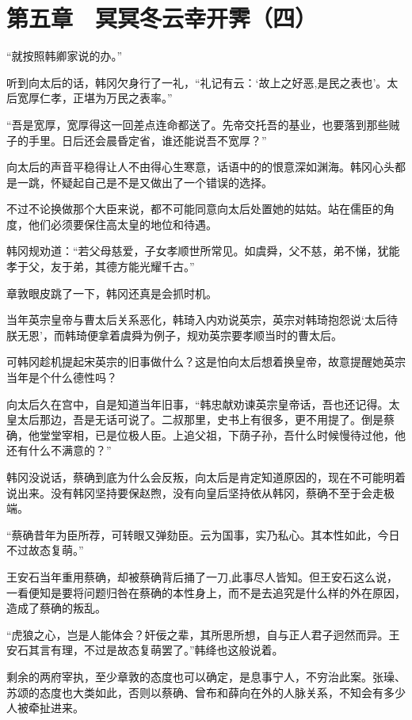 \section{第五章　冥冥冬云幸开霁（四）}

“就按照韩卿家说的办。”

听到向太后的话，韩冈欠身行了一礼，“礼记有云：‘故上之好恶,是民之表也’。太后宽厚仁孝，正堪为万民之表率。”

“吾是宽厚，宽厚得这一回差点连命都送了。先帝交托吾的基业，也要落到那些贼子的手里。日后还会晨昏定省，谁还能说吾不宽厚？”

向太后的声音平稳得让人不由得心生寒意，话语中的的恨意深如渊海。韩冈心头都是一跳，怀疑起自己是不是又做出了一个错误的选择。

不过不论换做那个大臣来说，都不可能同意向太后处置她的姑姑。站在儒臣的角度，他们必须要保住高太皇的地位和待遇。

韩冈规劝道：“若父母慈爱，子女孝顺世所常见。如虞舜，父不慈，弟不悌，犹能孝于父，友于弟，其德方能光耀千古。”

章敦眼皮跳了一下，韩冈还真是会抓时机。

当年英宗皇帝与曹太后关系恶化，韩琦入内劝说英宗，英宗对韩琦抱怨说‘太后待朕无恩’，而韩琦便拿着虞舜为例子，规劝英宗要孝顺当时的曹太后。

可韩冈趁机提起宋英宗的旧事做什么？这是怕向太后想着换皇帝，故意提醒她英宗当年是个什么德性吗？

向太后久在宫中，自是知道当年旧事，“韩忠献劝谏英宗皇帝话，吾也还记得。太皇太后那边，吾是无话可说了。二叔那里，史书上有很多，更不用提了。倒是蔡确，他堂堂宰相，已是位极人臣。上追父祖，下荫子孙，吾什么时候慢待过他，他还有什么不满意的？”

韩冈没说话，蔡确到底为什么会反叛，向太后是肯定知道原因的，现在不可能明着说出来。没有韩冈坚持要保赵煦，没有向皇后坚持依从韩冈，蔡确不至于会走极端。

“蔡确昔年为臣所荐，可转眼又弹劾臣。云为国事，实乃私心。其本性如此，今日不过故态复萌。”

王安石当年重用蔡确，却被蔡确背后捅了一刀,此事尽人皆知。但王安石这么说，一看便知是要将问题归咎在蔡确的本性身上，而不是去追究是什么样的外在原因，造成了蔡确的叛乱。

“虎狼之心，岂是人能体会？奸佞之辈，其所思所想，自与正人君子迥然而异。王安石其言有理，不过是故态复萌罢了。”韩绛也这般说着。

剩余的两府宰执，至少章敦的态度也可以确定，是息事宁人，不穷治此案。张璪、苏颂的态度也大类如此，否则以蔡确、曾布和薛向在外的人脉关系，不知会有多少人被牵扯进来。


